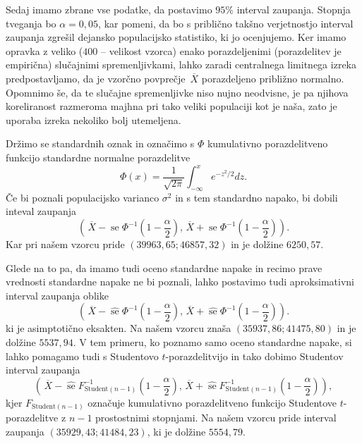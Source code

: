 \documentclass[a4paper,11pt]{article}
\newcommand{\olsi}[1]{\,\overline{\!{#1}}} %
\newcommand{\inv}{^{-1}}
\DeclareMathOperator{\se}{se}
\begin{document}
Sedaj imamo zbrane vse podatke, da postavimo $95\%$ interval zaupanja. Stopnja tveganja bo $\alpha = 0,05$, kar pomeni, da bo s priblično takšno verjetnostjo interval zaupanja zgrešil dejansko populacijsko statistiko, ki jo ocenjujemo. Ker imamo opravka z veliko ($400$ -- velikost vzorca) enako porazdeljenimi (porazdelitev je empirična) slučajnimi spremenljivkami, lahko zaradi centralnega limitnega izreka predpostavljamo, da je vzorčno povprečje $\olsi{X}$ porazdeljeno približno normalno. Opomnimo še, da te slučajne spremenljivke niso nujno neodvisne, je pa njihova koreliranost razmeroma majhna pri tako veliki populaciji kot je naša, zato je uporaba izreka nekoliko bolj utemeljena. 

Držimo se standardnih oznak in označimo s $\Phi$ kumulativno porazdelitveno funkcijo standardne normalne porazdelitve
\[
    \Phi(x) = \frac{1}{\sqrt{2 \pi}} \int_{-\infty}^{x} e^{-z^2/2}dz.
\]
Če bi poznali populacijsko varianco $\sigma^2$ in s tem standardno napako, bi dobili inteval zaupanja   
\begin{equation}
    \label{normalni IZ}    
    \left(\olsi{X} - \se \Phi\inv\left(1 - \frac{\alpha}{2}\right), 
    \olsi{X} + \se \Phi\inv\left(1 - \frac{\alpha}{2}\right)\right).
\end{equation}
Kar pri našem vzorcu pride $\left( 39963,65; 46857,32\right)$ in je dolžine $6250,57$.

Glede na to pa, da imamo tudi oceno standardne napake in recimo prave vrednosti standardne napake ne bi poznali, lahko postavimo tudi aproksimativni interval zaupanja oblike
\begin{equation}
    \label{aproksimativni IZ}
    \left(\olsi{X} - \hat{\se} \Phi\inv\left(1 - \frac{\alpha}{2}\right), 
    \olsi{X} + \hat{\se} \Phi\inv\left(1 - \frac{\alpha}{2}\right)\right).
\end{equation}
ki je asimptotično eksakten. Na našem vzorcu znaša $\left( 35937,86; 41475,80\right)$ in je dolžine $5537,94$. 
V tem primeru, ko poznamo samo oceno standardne napake, si lahko pomagamo tudi s Studentovo $t$-porazdelitvijo in tako dobimo Studentov interval zaupanja
\begin{equation}
    \label{studentov IZ}
    \left(\olsi{X} - \hat{\se} F_{\text{Student}(n-1)}\inv\left(1 - \frac{\alpha}{2}\right), 
    \olsi{X} + \hat{\se} F_{\text{Student}(n-1)}\inv\left(1 - \frac{\alpha}{2}\right)\right),
\end{equation}
kjer $F_{\text{Student}(n-1)}$ označuje kumulativno porazdelitveno funkcijo Studentove $t$-porazdelitve z $n-1$ prostostnimi stopnjami. Na našem vzorcu pride interval zaupanja $\left(35929,43; 41484,23\right)$, ki je dolžine $5554,79$.
\\
\end{document}
